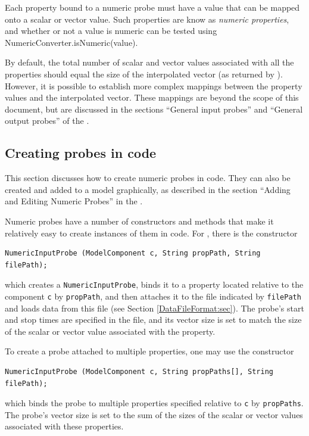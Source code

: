 Each property bound to a numeric probe must have a value
that can be mapped onto a scalar or vector value. Such properties
are know as {\it numeric properties}, and whether or not
a value is numeric can be tested
using %
{NumericConverter.isNumeric(value)}.

By default, the total number of scalar and vector values associated
with all the properties should equal the size of the interpolated
vector (as returned by
).
However, it is possible to establish more complex mappings between the
property values and the interpolated vector. These mappings are beyond
the scope of this document, but are discussed in the sections ``General
input probes'' and ``General output probes'' of the
.

\subsection{Creating probes in code}

This section discusses how to create numeric probes in code.  They can
also be created and added to a model graphically, as described in the
section ``Adding and Editing Numeric Probes'' in the
.

Numeric probes have a number of constructors and methods that make it
relatively easy to create instances of them in code. For 
, there
is the constructor
%
\begin{lstlisting}[]
   NumericInputProbe (ModelComponent c, String propPath, String filePath);
\end{lstlisting}
%
which creates a {\tt NumericInputProbe}, binds it to a property
located relative to the component {\tt c} by {\tt propPath}, and then
attaches it to the file indicated by {\tt filePath} and loads data
from this file (see Section \ref{DataFileFormat:sec}). The probe's start and
stop times are specified in the file, and its vector size is
set to match the size of the scalar or vector value associated with
the property.

To create a probe attached to multiple properties, one may use the
constructor
%
\begin{lstlisting}[]
   NumericInputProbe (ModelComponent c, String propPaths[], String filePath);
\end{lstlisting}
%
which binds the probe to multiple properties specified relative to
{\tt c} by {\tt propPaths}. The probe's vector size is set to
the sum of the sizes of the scalar or vector values associated with
these properties.

